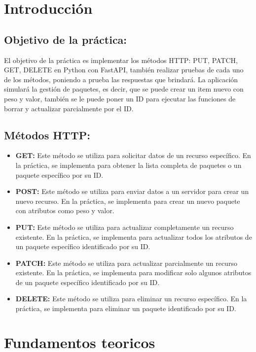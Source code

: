 \documentclass[12pt]{article}
\begin{document}
\section{Introducción}
\subsection*{Objetivo de la práctica:}
El objetivo de la práctica es implementar los métodos HTTP: PUT, PATCH, GET, DELETE en Python con FastAPI, también realizar pruebas de cada uno de los métodos, poniendo a prueba las respuestas que brindará. La aplicación simulará la gestión de paquetes, es decir, que se puede crear un item nuevo con peso y valor, también se le puede poner un ID para ejecutar las funciones de borrar y actualizar parcialmente por el ID. \\


\subsection*{Métodos HTTP:}
\begin{itemize}
    \item \textbf{GET:} Este método se utiliza para solicitar datos de un recurso específico. En la práctica, se implementa para obtener la lista completa de paquetes o un paquete específico por su ID.
    \item \textbf{POST:} Este método se utiliza para enviar datos a un servidor para crear un nuevo recurso. En la práctica, se implementa para crear un nuevo paquete con atributos como peso y valor.
    \item \textbf{PUT:} Este método se utiliza para actualizar completamente un recurso existente. En la práctica, se implementa para actualizar todos los atributos de un paquete específico identificado por su ID.
    \item \textbf{PATCH:} Este método se utiliza para actualizar parcialmente un recurso existente. En la práctica, se implementa para modificar solo algunos atributos de un paquete específico identificado por su ID.
    \item \textbf{DELETE:} Este método se utiliza para eliminar un recurso específico. En la práctica, se implementa para eliminar un paquete identificado por su ID. \cite{ref1}
\end{itemize}

\section{Fundamentos teoricos}
\end{document}
